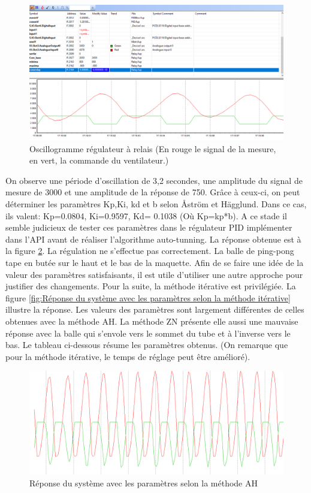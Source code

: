 \begin{figure}[h]
	\centering
	\includegraphics[width=\linewidth]{img/relay_1}
	\caption{Oscillogramme régulateur à relais (En rouge le signal de la mesure, en vert, la commande du ventilateur.)}
	\label{fig:Oscillogramme régulateur à relais}
\end{figure}

On observe une période d'oscillation de 3,2 secondes, une amplitude du signal de mesure de 3000 et une amplitude de la réponse de 750. Grâce à ceux-ci, on peut déterminer les paramètres Kp,Ki, kd et b selon Åström et Hägglund. Dans ce cas, ils valent: Kp=0.0804, Ki=0.9597, Kd= 0.1038 (Où Kp=kp*b). A ce stade il semble judicieux de tester ces paramètres dans le régulateur PID implémenter dans l'API avant de réaliser l'algorithme auto-tunning. La réponse obtenue est à la figure \ref{fig:Réponse du système avec les paramètres selon la méthode AH}. La régulation ne s'effectue pas correctement. La balle de ping-pong tape en butée sur le haut et le bas de la maquette. Afin de se faire une idée de la valeur des paramètres satisfaisants, il est utile d'utiliser une autre approche pour justifier des changements. Pour la suite, la méthode itérative est privilégiée. La figure \ref{fig:Réponse du système avec les paramètres selon la méthode itérative} illustre la réponse. Les valeurs des paramètres sont largement différentes de celles obtenues avec la méthode AH. La méthode ZN présente elle aussi une mauvaise réponse avec la balle qui s'envole vers le sommet du tube et à l'inverse vers le bas. Le tableau ci-dessous  résume les paramètres obtenus. (On remarque que pour la méthode itérative, le temps de réglage peut être amélioré). 


\begin{figure}[h]
	\centering
	\includegraphics[width=\linewidth]{img/Reglage PID ZN}
	\caption{Réponse du système avec les paramètres selon la méthode AH}
	\label{fig:Réponse du système avec les paramètres selon la méthode AH}
\end{figure}

